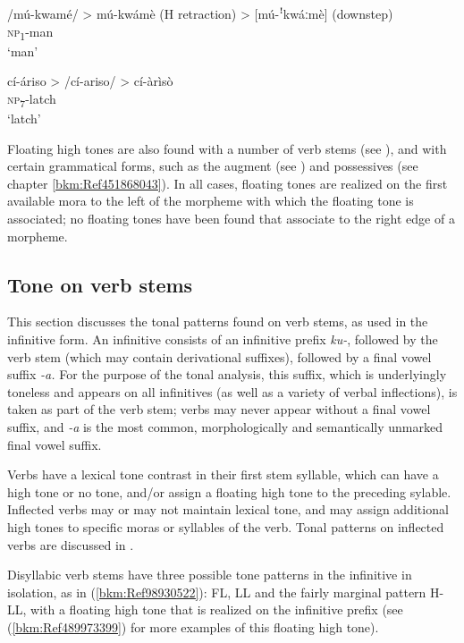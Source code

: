 \ea
\label{bkm:Ref71535921}
\gll /mú-kwamé/ > mú-kwámè (H retraction) > [mú-ꜝkwáːmè] (downstep)\\
\textsc{np}\textsubscript{1}-man\\
\glt ‘man’
\z

\ea
\label{bkm:Ref71535930}
cí-áriso > /cí-ariso/ > cí-àrìsò\\
\textsc{np}\textsubscript{7}-latch\\
\glt ‘latch’
\z

Floating high tones are also found with a number of verb stems (see ), and with cer\-tain grammatical forms, such as the augment (see ) and possessives (see chapter \ref{bkm:Ref451868043}). In all cases, floating tones are realized on the first available mora to the left of the morpheme with which the floating tone is associated; no floating tones have been found that associate to the right edge of a morpheme.

\subsection{Tone on verb stems}
\label{bkm:Ref71539940}\hypertarget{Toc75352627}{}\label{bkm:Ref71540163}\label{bkm:Ref71539970}
This section discusses the tonal patterns found on verb stems, as used in the infinitive form. An infinitive consists of an infinitive prefix \textit{ku-}, followed by the verb stem (which may contain derivational suffixes), followed by a final vowel suffix \textit{-a.} For the purpose of the to\-nal analysis, this suffix, which is underlyingly toneless and appears on all infinitives (as well as a variety of verbal inflections), is taken as part of the verb stem; verbs may never appear without a final vowel suffix, and \textit{-a} is the most common, morphologically and semantically unmarked final vowel suffix.

Verbs have a lexical tone contrast in their first stem syllable, which can have a high tone or no tone, and/or assign a floating high tone to the preceding sylable. Inflected verbs may or may not maintain lexi\-cal tone, and may assign additional high tones to specific moras or syllables of the verb. Tonal patterns on inflected verbs are discussed in .

Disyllabic verb stems have three possible tone patterns in the infinitive in isolation, as in (\ref{bkm:Ref98930522}): FL, LL and the fairly marginal pattern H-LL, with a floating high tone that is realized on the infini\-tive prefix (see (\ref{bkm:Ref489973399}) for more examples of this floating high tone).\pagebreak

